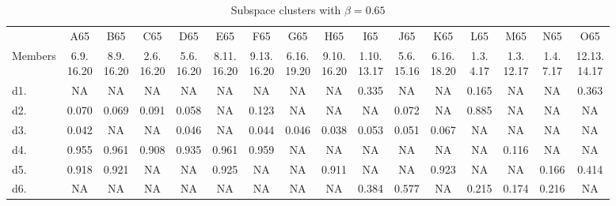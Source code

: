 \begin{table}
\renewcommand{\arraystretch}{0.95}
\centering\scriptsize
\setlength\tabcolsep{2pt} %
\caption{Subspace clusters with $\beta=0.65$\vspace*{-6pt}}
\label{tab:large65subspace}%
\begin{tabular}{lccccccccccccccc}
& A65   & B65   & C65   & D65   & E65   & F65   & G65   & H65   & I65   & J65   & K65   & L65   & M65   & N65   & O65 \\
Members & \shortstack{6.9.\\16.20} & \shortstack{8.9.\\16.20} & \shortstack{2.6.\\16.20} & \shortstack{5.6.\\16.20} & \shortstack{8.11.\\16.20} & \shortstack{9.13.\\16.20} & \shortstack{6.16.\\19.20} & \shortstack{9.10.\\16.20} & \shortstack{1.10.\\13.17} & \shortstack{5.6.\\15.16} & \shortstack{6.16.\\18.20} & \shortstack{1.3.\\4.17} & \shortstack{1.3.\\12.17} & \shortstack{1.4.\\7.17} & \shortstack{12.13.\\14.17} \\\toprule
d1. & NA    & NA    & NA    & NA    & NA    & NA    & NA    & NA    & 0.335 & NA    & NA    & 0.165 & NA    & NA    & 0.363 \\
d2. & 0.070 & 0.069 & 0.091 & 0.058 & NA    & 0.123 & NA    & NA    & NA    & 0.072 & NA    & 0.885 & NA    & NA    & NA \\
d3. & 0.042 & NA    & NA    & 0.046 & NA    & 0.044 & 0.046 & 0.038 & 0.053 & 0.051 & 0.067 & NA    & NA    & NA    & NA \\
d4. & 0.955 & 0.961 & 0.908 & 0.935 & 0.961 & 0.959 & NA    & NA    & NA    & NA    & NA    & NA    & 0.116 & NA    & NA \\
d5. & 0.918 & 0.921 & NA    & NA    & 0.925 & NA    & NA    & 0.911 & NA    & NA    & 0.923 & NA    & NA    & 0.166 & 0.414 \\
d6. & NA    & NA    & NA    & NA    & NA    & NA    & NA    & NA    & 0.384 & 0.577 & NA    & 0.215 & 0.174 & 0.216 & NA \\

\end{tabular}
\end{table}
